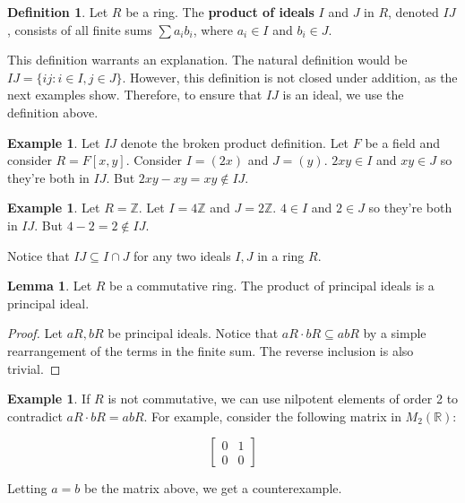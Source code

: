 \documentclass{article}
\theoremstyle{definition}
\newtheorem{definition}{Definition}
\newtheorem{lemma}[theorem]{Lemma}
\newtheorem{example}[theorem]{Example}
\newcommand{\Z}{\mathbb{Z}}
\newcommand{\R}{\mathbb{R}}
\begin{document}
\begin{definition}
    Let $R$ be a ring. The \textbf{product of ideals} $I$ and $J$ in $R$, denoted $IJ$, 
    consists of all finite sums $\sum a_{i}b_{i}$, where $a_{i} \in I$ and $b_{i} \in J$.
\end{definition}

This definition warrants an explanation. The natural definition would be 
$IJ = \{ ij : i \in I, j \in J\}$. 
However, this definition is not closed under addition, as the next examples show.
Therefore, to ensure that $IJ$ is an ideal, we use the definition above.

\begin{example}
    Let $IJ$ denote the broken product definition.
    Let $F$ be a field and consider $R = F[x,y]$. Consider $I = (2x)$ and $J = (y)$.
    $2xy \in I$ and $xy \in J$ so they're both in $IJ$. But $2xy - xy = xy \notin IJ$.
\end{example}

\begin{example}
    Let $R = \Z$. Let $I = 4\Z$ and $J = 2\Z$.
    $4 \in I$ and $2 \in J$ so they're both in $IJ$. But $4 - 2 = 2 \notin IJ$.
\end{example}

Notice that $IJ \subseteq I \cap J$ for any two ideals $I,J$ in a ring $R$.

\begin{lemma}
    Let $R$ be a commutative ring. The product of principal ideals is a principal ideal.
\end{lemma}
\begin{proof}
    Let $aR, bR$ be principal ideals. Notice that $aR \cdot bR \subseteq abR$ by a simple rearrangement
    of the terms in the finite sum. The reverse inclusion is also trivial.
\end{proof}

\begin{example}
    If $R$ is not commutative, we can use nilpotent elements of order 2 to contradict $aR \cdot bR = abR$. For example, consider the following matrix in $M_{2}(\R)$:

    \[\begin{bmatrix}
        0 & 1 \\
        0 & 0
    \end{bmatrix}\]

    Letting $a = b$ be the matrix above, we get a counterexample.
\end{example}
\end{document}
